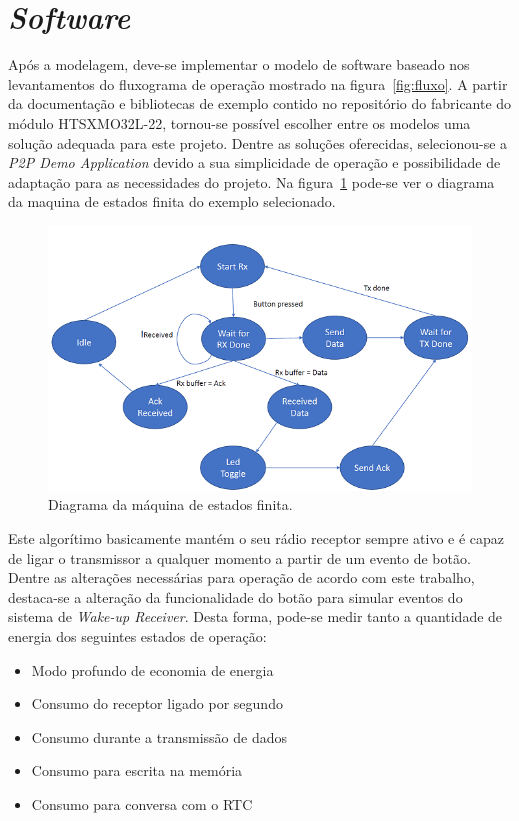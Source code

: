 \section{\textit{Software}}
Após a modelagem, deve-se implementar o modelo de software baseado nos levantamentos do fluxograma de operação mostrado na figura~\ref{fig:fluxo}. A partir da documentação e bibliotecas de exemplo contido no repositório do fabricante do módulo HTSXMO32L-22, tornou-se possível escolher entre os modelos uma solução adequada para este projeto.
Dentre as soluções oferecidas, selecionou-se a \textit{P2P Demo Application} devido a sua simplicidade de operação e possibilidade de adaptação para as necessidades do projeto. Na figura~\ref{fig:p2p} pode-se ver o diagrama da maquina de estados finita do exemplo selecionado.

\begin{figure}
  \caption{Diagrama da máquina de estados finita.}
  \begin{center}
      \includegraphics[scale=0.8]{img/p2p_fsm.PNG}
  \end{center}
  \label{fig:p2p}
\end{figure}

Este algorítimo basicamente mantém o seu rádio receptor sempre ativo e é capaz de ligar o transmissor a qualquer momento a partir de um evento de botão. Dentre as alterações necessárias para operação de acordo com este trabalho, destaca-se a alteração da funcionalidade do botão para simular eventos do sistema de \textit{Wake-up Receiver}. Desta forma, pode-se medir tanto a quantidade de energia dos seguintes estados de operação:
\begin{itemize}
    \item Modo profundo de economia de energia
    \item Consumo do receptor ligado por segundo
    \item Consumo durante a transmissão de dados
    \item Consumo para escrita na memória
    \item Consumo para conversa com o RTC
\end{itemize}

